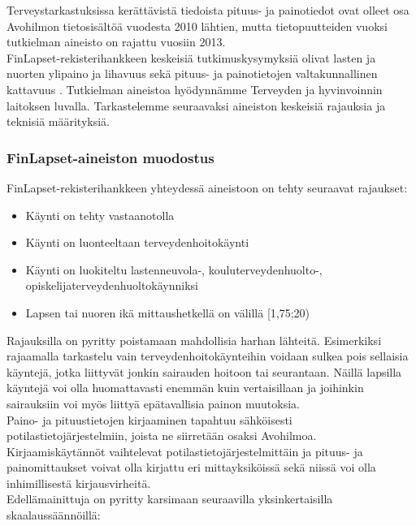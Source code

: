 \documentclass[finnish]{docopts}
\begin{document}
Terveystarkastuksissa kerättävistä tiedoista pituus- ja painotiedot ovat olleet osa Avohilmon tietosisältöä vuodesta 2010 lähtien, mutta tietopuutteiden vuoksi tutkielman aineisto on rajattu vuosiin 2013.\\

FinLapset-rekisterihankkeen keskeisiä tutkimuskysymyksiä olivat lasten ja nuorten ylipaino ja lihavuus sekä pituus- ja painotietojen valtakunnallinen kattavuus \cite{finlapsetrekisteri}. Tutkielman aineistoa hyödynnämme Terveyden ja hyvinvoinnin laitoksen luvalla. Tarkastelemme seuraavaksi aineiston keskeisiä rajauksia ja teknisiä määrityksiä. \\

\subsubsection{FinLapset-aineiston muodostus}
\label{ssb:finlapsetdatamuod}

FinLapset-rekisterihankkeen yhteydessä aineistoon on tehty seuraavat rajaukset:

\begin{itemize}
    \item Käynti on tehty vastaanotolla
    \item Käynti on luonteeltaan terveydenhoitokäynti
    \item Käynti on luokiteltu lastenneuvola-, kouluterveydenhuolto-, opiskelijaterveydenhuoltokäynniksi
    \item Lapsen tai nuoren ikä mittaushetkellä on välillä [1,75;20)
\end{itemize}

Rajauksilla on pyritty poistamaan mahdollisia harhan lähteitä. Esimerkiksi rajaamalla tarkastelu vain terveydenhoitokäynteihin voidaan sulkea pois sellaisia käyntejä, jotka liittyvät jonkin sairauden hoitoon tai seurantaan. Näillä lapsilla käyntejä voi olla huomattavasti enemmän kuin vertaisillaan ja joihinkin sairauksiin voi myös liittyä epätavallisia painon muutoksia. \\

Paino- ja pituustietojen kirjaaminen tapahtuu sähköisesti potilastietojärjestelmiin, joista ne siirretään osaksi Avohilmoa. Kirjaamiskäytännöt vaihtelevat potilastietojärjestelmittäin ja pituus- ja painomittaukset voivat olla kirjattu eri mittayksiköissä sekä niissä voi olla inhimillisestä kirjausvirheitä.\\

Edellämainittuja on pyritty karsimaan seuraavilla yksinkertaisilla skaalaussäännöillä:
\end{document}
